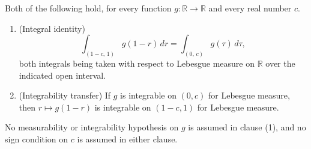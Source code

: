 \begin{lemma}
Both of the following hold, for every function $g : \mathbb{R} \to \mathbb{R}$
and every real number $c$.
\begin{enumerate}
  \item (Integral identity)
    \[
      \int_{(1-c,\,1)} g(1-r)\, dr = \int_{(0,\,c)} g(\tau)\, d\tau ,
    \]
    both integrals being taken with respect to Lebesgue measure on
    $\mathbb{R}$ over the indicated open interval.
  \item (Integrability transfer) If $g$ is integrable on $(0,c)$ for Lebesgue
    measure, then $r \mapsto g(1-r)$ is integrable on $(1-c,1)$ for Lebesgue
    measure.
\end{enumerate}
No measurability or integrability hypothesis on $g$ is assumed in clause (1),
and no sign condition on $c$ is assumed in either clause.
\end{lemma}
